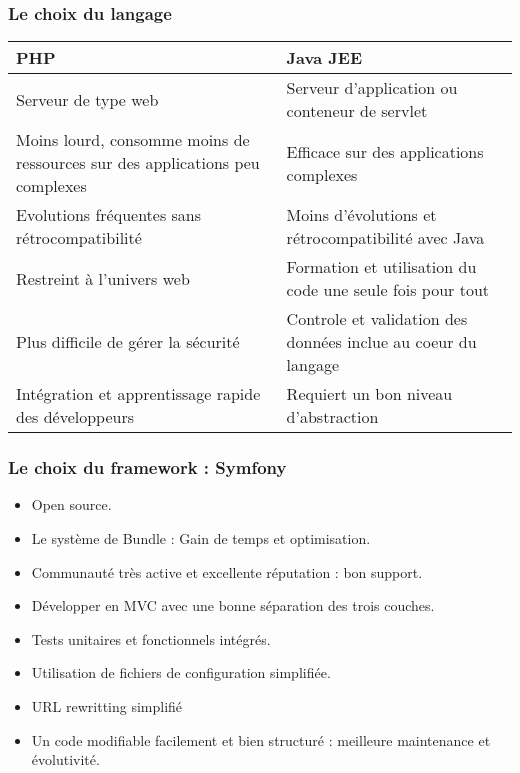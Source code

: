 \begin{frame}
  \frametitle{Le choix du langage}
  \begin{center}
    \begin{tabular}[h]{|p{}|p{}|}
	\hline
	\cellcolor{gray!40}PHP & \cellcolor{gray!40}Java JEE \\\hline
        Serveur de type web & Serveur d'application ou conteneur de servlet \\\hline
        Moins lourd, consomme moins de ressources sur des applications peu complexes & Efficace sur des applications complexes \\\hline
        Evolutions fréquentes sans rétrocompatibilité & Moins d'évolutions et rétrocompatibilité avec Java \\\hline
        Restreint à l'univers web & Formation et utilisation du code une seule fois pour tout \\\hline
        Plus difficile de gérer la sécurité & Controle et validation des données inclue au coeur du langage \\\hline
        Intégration et apprentissage rapide des développeurs & Requiert un bon niveau d'abstraction \\\hline
    \end{tabular}
  \end{center}
\end{frame}

\begin{frame}
  \frametitle{Le choix du framework : Symfony}
  \begin{itemize}
    \item Open source.
    \item Le système de Bundle : Gain de temps et optimisation.
    \item Communauté très active et excellente réputation : bon support.    
    \item Développer en MVC avec une bonne séparation des trois couches.
    \item Tests unitaires et fonctionnels intégrés.
    \item Utilisation de fichiers de configuration simplifiée.
    \item URL rewritting simplifié
    \item Un code modifiable facilement et bien structuré : meilleure maintenance et évolutivité.
  \end{itemize}
\end{frame}
